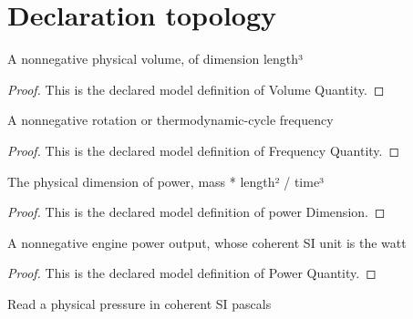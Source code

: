 \section{Declaration topology}
\begin{definition}
  \label{def:physics:phyx-mini-0426:phyxminiproblems-problemphyxmini0426-volumequantity}
  A nonnegative physical volume, of dimension length³
\end{definition}
\begin{proof}
  This is the declared model definition of Volume Quantity.
\end{proof}
\begin{definition}
  \label{def:physics:phyx-mini-0426:phyxminiproblems-problemphyxmini0426-frequencyquantity}
  A nonnegative rotation or thermodynamic-cycle frequency
\end{definition}
\begin{proof}
  This is the declared model definition of Frequency Quantity.
\end{proof}
\begin{definition}
  \label{def:physics:phyx-mini-0426:phyxminiproblems-problemphyxmini0426-powerdimension}
  The physical dimension of power, mass * length² / time³
\end{definition}
\begin{proof}
  This is the declared model definition of power Dimension.
\end{proof}
\begin{definition}
  \label{def:physics:phyx-mini-0426:phyxminiproblems-problemphyxmini0426-powerquantity}
  A nonnegative engine power output, whose coherent SI unit is the watt
\end{definition}
\begin{proof}
  This is the declared model definition of Power Quantity.
\end{proof}
\begin{definition}
  \label{def:physics:phyx-mini-0426:phyxminiproblems-problemphyxmini0426-pressureinpascals}
  Read a physical pressure in coherent SI pascals
\end{definition}
